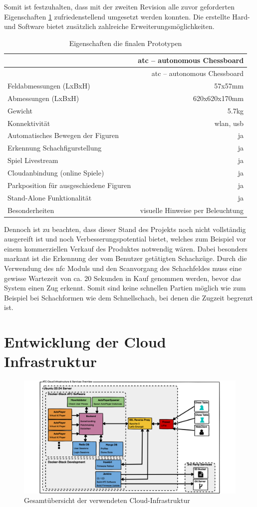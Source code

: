Somit ist festzuhalten, dass mit der zweiten Revision alle zuvor
geforderten Eigenschaften \ref{finalfeaturesatc} zufriedenstellend
umgesetzt werden konnten. Die erstellte Hard- und Software bietet
zusätzlich zahlreiche Erweiterungsmöglichkeiten.

\begin{longtable}[]{@{}lr@{}}
\caption{Eigenschaften die finalen Prototypen
\label{finalfeaturesatc}}\tabularnewline
\toprule
& \gls{atc} -- autonomous Chessboard\tabularnewline
\midrule
\endfirsthead
\toprule
& \gls{atc} -- autonomous Chessboard\tabularnewline
\midrule
\endhead
Feldabmessungen (LxBxH) & 57x57mm\tabularnewline
Abmessungen (LxBxH) & 620x620x170mm\tabularnewline
Gewicht & 5.7kg\tabularnewline
Konnektivität & \gls{wlan}, \gls{usb}\tabularnewline
Automatisches Bewegen der Figuren & ja\tabularnewline
Erkennung Schachfigurstellung & ja\tabularnewline
Spiel Livestream & ja\tabularnewline
Cloudanbindung (online Spiele) & ja\tabularnewline
Parkposition für ausgeschiedene Figuren & ja\tabularnewline
Stand-Alone Funktionalität & ja\tabularnewline
Besonderheiten & visuelle Hinweise per Beleuchtung\tabularnewline
\bottomrule
\end{longtable}

Dennoch ist zu beachten, dass dieser Stand des Projekts noch nicht
vollständig ausgereift ist und noch Verbesserungspotential bietet,
welches zum Beispiel vor einem kommerziellen Verkauf des Produktes
notwendig wären. Dabei besonders markant ist die Erkennung der vom
Benutzer getätigten Schachzüge. Durch die Verwendung des \gls{nfc}
Moduls und den Scanvorgang des Schachfeldes muss eine gewisse Wartezeit
von ca. 20 Sekunden in Kauf genommen werden, bevor das System einen Zug
erkennt. Somit sind keine schnellen Partien möglich wie zum Beispiel bei
Schachformen wie dem Schnellschach, bei denen die Zugzeit begrenzt ist.

\hypertarget{entwicklung-der-cloud-infrastruktur}{%
\chapter{Entwicklung der Cloud
Infrastruktur}\label{entwicklung-der-cloud-infrastruktur}}

\begin{figure}
\centering
\includegraphics{images/ATC_Cloud_Architecture.png}
\caption{Gesamtübersicht der verwendeten Cloud-Infrastruktur
\label{ATC_Cloud_Architecture}}
\end{figure}


